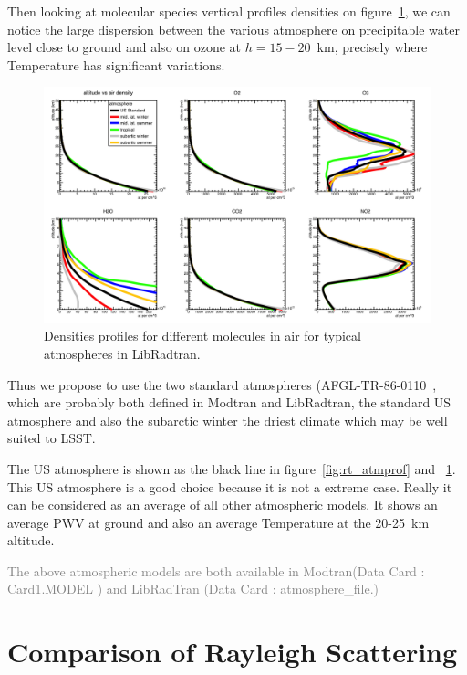 \documentclass[a4paper]{article}
\begin{document}
Then looking at molecular species vertical profiles densities on figure~\ref{fig:rt_atm_densities}, we can notice the large dispersion between the various atmosphere on precipitable water level close to ground and also on ozone at $h=15-20$~km, precisely where Temperature has significant variations.
\begin{figure}
\centering
\includegraphics[width=1\textwidth]{images/rt_atm_densities.png}
\caption{\label{fig:rt_atm_densities}Densities profiles for different molecules in air for typical atmospheres in LibRadtran.}
\end{figure}

Thus we propose to use the two standard atmospheres (AFGL-TR-86-0110~\cite{AFGL76}, which are probably both defined in Modtran and LibRadtran, 
the standard US atmosphere and also the subarctic winter the driest  climate which may be well suited to LSST. 
 
 
The US atmosphere is shown as the black line in figure~\ref{fig:rt_atmprof} and ~\ref{fig:rt_atm_densities}. 
This US atmosphere is a good choice because it is not a extreme case. 
Really it can be considered as an average of all other atmospheric models. It shows an average PWV at ground and also an average Temperature at the  20-25~km altitude.

\textcolor{gray}{The above atmospheric models are both available in Modtran(Data Card : Card1.MODEL )  and LibRadTran (Data Card : atmosphere\_file.)}


\section{Comparison of Rayleigh Scattering}
\end{document}
